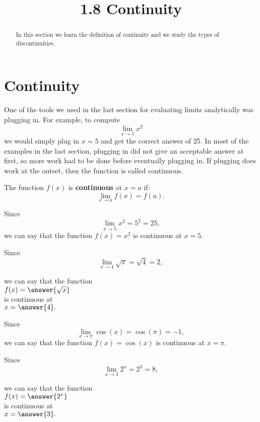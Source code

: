 \documentclass{ximera}
\title{1.8 Continuity}
\begin{document}
\begin{abstract}
In this section we learn the definition of continuity and we study the types of discontinuities.
\end{abstract}

\maketitle






\section{Continuity}

One of the tools we used in the last section for evaluating limits analytically was plugging in. For example, to compute
\[\lim_{x \to 5} x^2 \]
we would simply plug in $x = 5$ and get the correct answer of 25. In most of the examples in the last section, 
plugging in 
did not give an acceptable answer at first, so more work had to be done before eventually plugging in. 
If plugging does work at the outset, then the function is called continuous.

\begin{definition}[Continuity]
The function $f(x)$ is \textbf{continuous} at $x = a$ if:
\[\lim_{x \to a} f(x) = f(a).\]
\end{definition}

\begin{example}
Since
\[\lim_{x \to 5} x^2 = 5^2 = 25,\]
we can say that the function $f(x) = x^2$ is continuous at $x = 5$.
\end{example}

\begin{problem}
Since
\[\lim_{x \to 4} \sqrt{x} = \sqrt{4} = 2,\]
\begin{center}
we can say that the function \\
$f(x) = \answer{\sqrt x}$ \\
is continuous at \\
$x = \answer{4}.$
\end{center}
\end{problem}


\begin{example}
Since
\[\lim_{x \to \pi} \cos(x) = \cos(\pi) = -1,\]
we can say that the function $f(x) = \cos(x)$ is continuous at $x = \pi$.
\end{example}

\begin{problem}
Since
\[\lim_{x \to 3} 2^x = 2^3 = 8,\]
\begin{center}
we can say that the function \\
$f(x) = \answer{2^x}$ \\
is continuous at \\
$x = \answer{3}.$
\end{center}
\end{problem}
\end{document}
